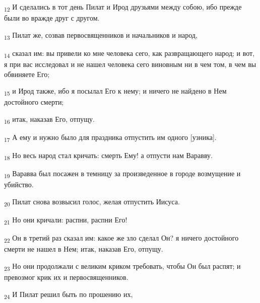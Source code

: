 \begin{tcolorbox}
\textsubscript{12} И сделались в тот день Пилат и Ирод друзьями между собою, ибо прежде были во вражде друг с другом.
\end{tcolorbox}
\begin{tcolorbox}
\textsubscript{13} Пилат же, созвав первосвященников и начальников и народ,
\end{tcolorbox}
\begin{tcolorbox}
\textsubscript{14} сказал им: вы привели ко мне человека сего, как развращающего народ; и вот, я при вас исследовал и не нашел человека сего виновным ни в чем том, в чем вы обвиняете Его;
\end{tcolorbox}
\begin{tcolorbox}
\textsubscript{15} и Ирод также, ибо я посылал Его к нему; и ничего не найдено в Нем достойного смерти;
\end{tcolorbox}
\begin{tcolorbox}
\textsubscript{16} итак, наказав Его, отпущу.
\end{tcolorbox}
\begin{tcolorbox}
\textsubscript{17} А ему и нужно было для праздника отпустить им одного [узника].
\end{tcolorbox}
\begin{tcolorbox}
\textsubscript{18} Но весь народ стал кричать: смерть Ему! а отпусти нам Варавву.
\end{tcolorbox}
\begin{tcolorbox}
\textsubscript{19} Варавва был посажен в темницу за произведенное в городе возмущение и убийство.
\end{tcolorbox}
\begin{tcolorbox}
\textsubscript{20} Пилат снова возвысил голос, желая отпустить Иисуса.
\end{tcolorbox}
\begin{tcolorbox}
\textsubscript{21} Но они кричали: распни, распни Его!
\end{tcolorbox}
\begin{tcolorbox}
\textsubscript{22} Он в третий раз сказал им: какое же зло сделал Он? я ничего достойного смерти не нашел в Нем; итак, наказав Его, отпущу.
\end{tcolorbox}
\begin{tcolorbox}
\textsubscript{23} Но они продолжали с великим криком требовать, чтобы Он был распят; и превозмог крик их и первосвященников.
\end{tcolorbox}
\begin{tcolorbox}
\textsubscript{24} И Пилат решил быть по прошению их,
\end{tcolorbox}
